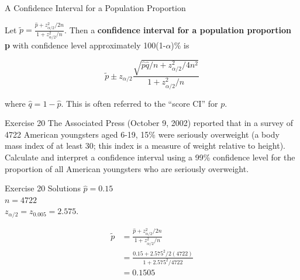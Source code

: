 \documentclass[
  ignorenonframetext,
]{beamer}
\begin{document}
\begin{frame}{A Confidence Interval for a Population Proportion}
\protect\hypertarget{a-confidence-interval-for-a-population-proportion-2}{}
\begin{tcolorbox}[enhanced jigsaw, titlerule=0mm, colbacktitle=quarto-callout-important-color!10!white, opacityback=0, bottomrule=.15mm, colback=white, colframe=quarto-callout-important-color-frame, arc=.35mm, title=\textcolor{quarto-callout-important-color}{\faExclamation}\hspace{0.5em}{Proposition}, toprule=.15mm, breakable, coltitle=black, leftrule=.75mm, bottomtitle=1mm, left=2mm, rightrule=.15mm, toptitle=1mm, opacitybacktitle=0.6]

Let
\(\tilde{p} = \frac{\hat{p} + z_{\alpha/2}^{2}/2n}{1 + z^{2}_{\alpha/2}/n}\).
Then a \textbf{confidence interval for a population proportion p} with
confidence level approximately 100(1-\(\alpha\))\% is

\[
\tilde{p} \pm z_{\alpha/2}\frac{\sqrt{\hat{p}\hat{q}/n + z_{\alpha/2}^{2}/4n^{2}}}{1+z^{2}_{\alpha/2}/n}
\]

where \(\hat{q} = 1 - \hat{p}\). This is often referred to the ``score
CI'' for \(p\).

\end{tcolorbox}
\end{frame}

\begin{frame}{Exercise 20}
\protect\hypertarget{exercise-20}{}
The Associated Press (October 9, 2002) reported that in a survey of 4722
American youngsters aged 6-19, 15\% were seriously overweight (a body
mass index of at least 30; this index is a measure of weight relative to
height). Calculate and interpret a confidence interval using a 99\%
confidence level for the proportion of all American youngsters who are
seriously overweight.
\end{frame}

\begin{frame}{Exercise 20 Solutions}
\protect\hypertarget{exercise-20-solutions}{}
\(\hat{p} = 0.15\)\\
\(n = 4722\)\\
\(z_{\alpha/2} = z_{0.005} = 2.575\).

\[ 
\begin{aligned}
\tilde{p} &= \frac{\hat{p} + z_{\alpha/2}^{2}/2n}{1 + z^{2}_{\alpha/2}/n} \\
&= \frac{0.15 + 2.575^{2}/2(4722)}{1 + 2.575^{2}/4722} \\
&= 0.1505
\end{aligned}
\]
\end{frame}
\end{document}
